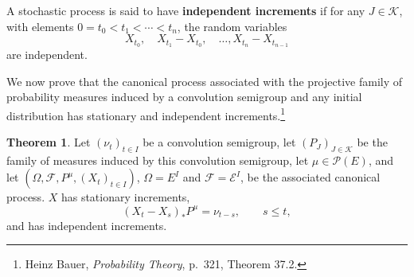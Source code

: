 \documentclass{article}
\theoremstyle{definition}
\newtheorem{theorem}{Theorem}
\theoremstyle{definition}
\begin{document}
A stochastic process is said to have \textbf{independent increments} if for
any $J \in \mathscr{K}$, with elements $0=t_0<t_1<\cdots<t_n$,
the random variables
\[
X_{t_0}, \quad X_{t_1}-X_{t_0}, \quad \ldots, X_{t_n} - X_{t_{n-1}}
\]
are independent. 

We now prove that the canonical process associated with the projective family of probability measures induced
by a convolution semigroup and any initial distribution has stationary and independent increments.\footnote{Heinz Bauer,
{\em Probability Theory}, p.~321, Theorem 37.2.}

\begin{theorem}
Let $(\nu_t)_{t \in I}$ be a convolution semigroup,
let $(P_J)_{J \in \mathscr{K}}$ be the family of measures induced by this convolution semigroup,
let $\mu \in \mathscr{P}(E)$, and let
$(\Omega,\mathscr{F},P^\mu,(X_t)_{t \in I})$,
$\Omega=E^I$ and $\mathscr{F}=\mathscr{E}^I$,
 be the associated canonical process. 
 $X$ has stationary increments,
 \begin{equation}
 (X_t-X_s)_*P^\mu = \nu_{t-s}, \qquad s \leq t,
 \label{377}
 \end{equation}
 and has independent increments.
 \label{increments}
\end{theorem}
\end{document}
